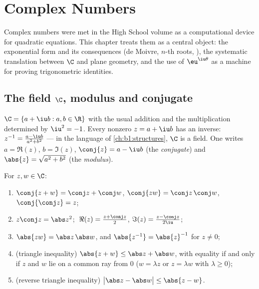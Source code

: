 \chapter{Complex Numbers}\label{ch:b1:complex}

Complex numbers were met in the High School volume as a computational
device for quadratic equations. This chapter treats them as a central
object: the exponential form and its consequences (de Moivre, $n$-th
roots, ), the systematic translation between $\C$ and
plane geometry, and the use of $\eu^{\iu\theta}$ as a machine for
proving trigonometric identities.

\section{The field $\C$, modulus and conjugate}

\begin{definition}\label{def:b1:complex:field}
$\C = \{a + \iu b : a, b \in \R\}$ with the usual addition and the
multiplication determined by $\iu^2 = -1$. Every nonzero $z = a + \iu
b$ has an inverse: $z^{-1} = \frac{a - \iu b}{a^2 + b^2}$ --- in the
language of \cref{ch:b1:structures}, $\C$ is a field. One writes $a =
\Re(z)$, $b = \Im(z)$, $\conj{z} = a - \iu b$ (the
\emph{conjugate}) and $\abs{z} = \sqrt{a^2 + b^2}$
(the \emph{modulus}).
\end{definition}

\begin{proposition}\label{prop:b1:complex:rules}
For $z, w \in \C$:
\begin{enumerate}
  \item $\conj{z + w} = \conj z + \conj w$, $\conj{zw} = \conj z\,
        \conj w$, $\conj{\conj z} = z$;
  \item $z \conj z = \abs z^2$; $\;\Re(z) = \frac{z + \conj z}{2}$,
        $\Im(z) = \frac{z - \conj z}{2\iu}$;
  \item $\abs{zw} = \abs z\, \abs w$, and $\abs{z^{-1}} =
        \abs{z}^{-1}$ for $z \neq 0$;
  \item (triangle inequality) $\abs{z + w}
        \leq \abs z + \abs w$, with equality if and only if $z$ and
        $w$ lie on a common ray from $0$ ($w = \lambda z$ or
        $z = \lambda w$ with $\lambda \geq 0$);
  \item (reverse triangle inequality) $\bigl|\abs z - \abs w\bigr|
        \leq \abs{z - w}$.
\end{enumerate}
\end{proposition}


